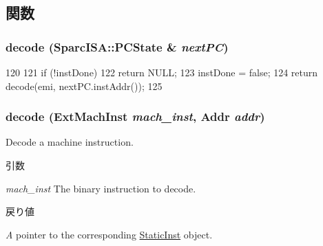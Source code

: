 \subsection{関数}
\hypertarget{classSparcISA_1_1Decoder_a1a256bfe4c8b7dd7e067a4925dd3e9a4}{
\subsubsection[{decode}]{ decode ({\bf SparcISA::PCState} \& {\em nextPC})}}
\label{classSparcISA_1_1Decoder_a1a256bfe4c8b7dd7e067a4925dd3e9a4}



\begin{DoxyCode}
120     {
121         if (!instDone)
122             return NULL;
123         instDone = false;
124         return decode(emi, nextPC.instAddr());
125     }
\end{DoxyCode}
\hypertarget{classSparcISA_1_1Decoder_a4ed948f8d08575cc2916fe32154ea69d}{
\subsubsection[{decode}]{ decode ({\bf ExtMachInst} {\em mach\_\-inst}, \/  {\bf Addr} {\em addr})}}
\label{classSparcISA_1_1Decoder_a4ed948f8d08575cc2916fe32154ea69d}
Decode a machine instruction. 
\begin{DoxyParams}{引数}
\item[{\em mach\_\-inst}]The binary instruction to decode. \end{DoxyParams}

\begin{DoxyRetVals}{戻り値}
\item[{\em A}]pointer to the corresponding \hyperlink{classStaticInst}{StaticInst} object. \end{DoxyRetVals}



